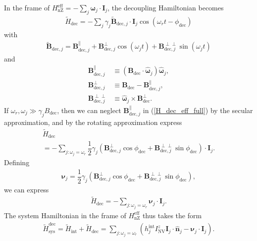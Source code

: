 \documentclass[twocolumn]{revtex4}
\renewcommand{\t}{\text} %
\newcommand{\f}[2]{\dfrac{#1}{#2}} %
\newcommand{\p}[1]{\left(#1\right)} %
\renewcommand{\v}{\bm} %
\newcommand{\uv}[1]{\hat{\v{#1}}} %
\renewcommand{\c}{\cdot} %
\newcommand{\NV}{\t{NV}}
\begin{document}
In the frame of $H_\t{nZ}^\t{eff}=-\sum_j\v\omega_j\c\v I_j$, the
decoupling Hamiltonian becomes
\begin{align}
  \tilde H_\t{dec} = -\sum_j\gamma_j\tilde{\v B}_{\t{dec},j}
  \c\v I_j \cos\p{\omega_rt-\phi_\t{dec}}
  \label{H_dec_eff_full}
\end{align}
with
\begin{align}
  \tilde{\v B}_{\t{dec},j} = \v B_{\t{dec},j}^\parallel
  + \v B_{\t{dec},j}^\perp\cos\p{\omega_j t}
  + \v B_{\t{dec},j}^{\perp\perp}\sin\p{\omega_j t}
\end{align}
and
\begin{align}
  \v B_{\t{dec},j}^\parallel
  &\equiv \p{\v B_\t{dec} \c\uv\omega_j}\uv\omega_j, \\
  \v B_{\t{dec},j}^\perp
  &\equiv \v B_\t{dec} - \v B_{\t{dec},j}^\parallel, \\
  \v B_{\t{dec},j}^{\perp\perp}
  &\equiv \uv\omega_j\times\v B_\t{dec}^\perp.
\end{align}
If $\omega_r,\omega_j\gg \gamma_jB_\t{dec}$, then we can neglect
$\v B_{\t{dec},j}^\parallel$ in (\ref{H_dec_eff_full}) by the secular
approximation, and by the rotating approximation express
\begin{multline}
  \tilde H_\t{dec} \\
  = -\sum_{j:\omega_j=\omega_r}
  \f12\gamma_j\p{\v B_{\t{dec},j}^\perp\cos\phi_\t{dec}
  + \v B_{\t{dec},j}^{\perp\perp}\sin\phi_\t{dec}}\c\v I_j.
\end{multline}
Defining
\begin{align}
  \v\nu_j = \f12\gamma_j\p{\v B_{\t{dec},j}^\perp\cos\phi_\t{dec}
  + \v B_{\t{dec},j}^{\perp\perp}\sin\phi_\t{dec}},
\end{align}
we can express
\begin{align}
  \tilde H_\t{dec} = -\sum_{j:\omega_j=\omega_r}\v\nu_j\c\v I_j.
\end{align}
The system Hamiltonian in the frame of $H_\t{nZ}^\t{eff}$ thus takes
the form
\begin{align}
  \tilde H_\t{sys}^\t{dec} = \tilde H_\t{int} + \tilde H_\t{dec}
  = \sum_{j:\omega_j=\omega_r}
  \p{h_j^\t{int}I_\NV^z\v I_j\c\uv n_j - \v\nu_j\c\v I_j}.
\end{align}
\end{document}
